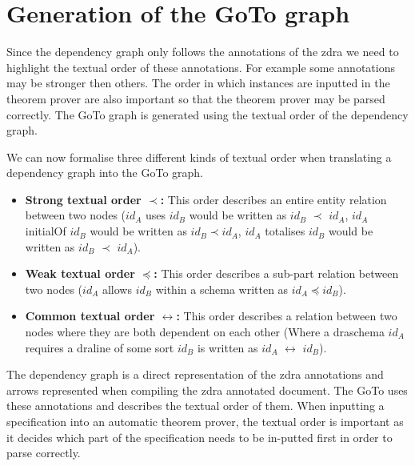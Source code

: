 \section{Generation of the GoTo graph}

Since the dependency graph only follows the annotations of the \gls{zdra} we need to highlight the textual order of these annotations. For example some annotations may be stronger then others. The order in which instances are inputted in the theorem prover are also important so that the theorem prover may be parsed correctly. The GoTo graph is generated using the textual order of the dependency graph.

\begin{defin}
We can now formalise three different kinds of textual order when translating a dependency graph into the GoTo graph.

\begin{itemize}
\item \textbf{Strong textual order $\prec$:} This order describes an entire entity relation between two nodes ($id_{A}$ uses $id_{B}$ would be written as $id_{B}$ $\prec$ $id_{A}$, $id_{A}$ initialOf $id_{B}$ would be written as $id_{B} \prec id_{A}$, $id_{A}$ totalises $id_{B}$ would be written as $id_{B}$ $\prec$ $id_{A}$).

\item \textbf{Weak textual order $\preceq$:} This order describes a sub-part relation between two nodes ($id_{A}$ allows $id_{B}$ within a schema written as $id_{A} \preceq id_{B}$).

\item \textbf{Common textual order $\leftrightarrow$:} This order describes a relation between two nodes where they are both dependent on each other (Where a draschema $id_{A}$ requires a draline of some sort $id_{B}$ is written as $id_{A}$ $\leftrightarrow$ $id_{B}$).
\end{itemize}
\end{defin}

The dependency graph is a direct representation of the \gls{zdra} annotations and arrows represented when compiling the \gls{zdra} annotated document. The GoTo uses these annotations and describes the textual order of them. When inputting a specification into an automatic theorem prover, the textual order is important as it decides which part of the specification needs to be in-putted first in order to parse correctly.

